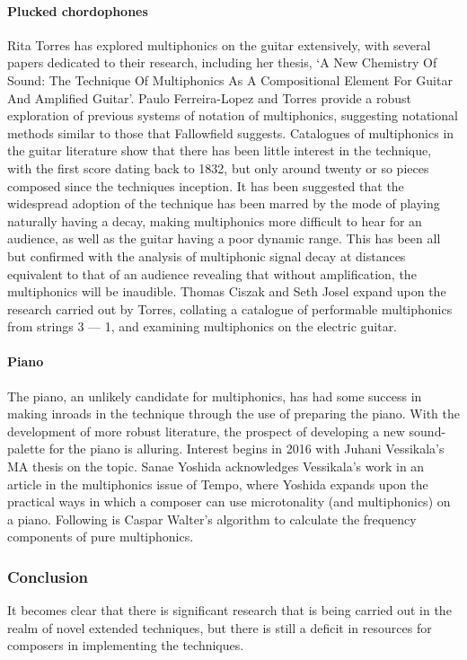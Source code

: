 \paragraph{Plucked chordophones}
Rita Torres has explored multiphonics on the guitar extensively, with several papers dedicated to their research, including her thesis, `A New Chemistry Of Sound: The Technique Of Multiphonics As A Compositional Element For Guitar And Amplified Guitar'.\autocite{torresMultiphonicsCompositionalElement2012}
Paulo Ferreira-Lopez and Torres provide a robust exploration of previous systems of notation of multiphonics, suggesting notational methods similar to those that Fallowfield suggests.\autocite{ferreira-lopesGuitarMultiphonicsNotations}
Catalogues of multiphonics in the guitar literature show that there has been little interest in the technique, with the first score dating back to 1832, but only around twenty or so pieces composed since the techniques inception.\autocite[80--82]{torresSoundWorldGuitar2018}
It has been suggested that the widespread adoption of the technique has been marred by the mode of playing naturally having a decay, making multiphonics more difficult to hear for an audience, as well as the guitar having a poor dynamic range.\autocite[21--22]{Torres2014TowardsOT}
This has been all but confirmed with the analysis of multiphonic signal decay at distances equivalent to that of an audience revealing that without amplification, the multiphonics will be inaudible.\autocite[279]{torresGuitarMultiphonicsInfluence2014}
Thomas Ciszak and Seth Josel expand upon the research carried out by Torres, collating a catalogue of performable multiphonics from strings 3 --- 1, and examining multiphonics on the electric guitar.\autocite{ciszakNeonLightMultiphonic2020}

\paragraph{Piano}
The piano, an unlikely candidate for multiphonics, has had some success in making inroads in the technique through the use of preparing the piano.
With the development of more robust literature, the prospect of developing a new sound-palette for the piano is alluring.
Interest begins in 2016 with Juhani Vessikala's MA thesis on the topic.\autocite{vesikkalaMultiphonicsGrandPiano2016}
Sanae Yoshida acknowledges Vessikala's work in an article in the multiphonics issue of Tempo, where Yoshida expands upon the practical ways in which a composer can use microtonality (and multiphonics) on a piano.\autocite{yoshidaMicrotonalPianoTunedIn2020}
Following is Caspar Walter's algorithm to calculate the frequency components of pure multiphonics.\autocite{casparjohanneswalterVariantsContinuedFraction2019}

\subsubsection{Conclusion}
It becomes clear that there is significant research that is being carried out in the realm of novel extended techniques, but there is still a deficit in resources for composers in implementing the techniques.
